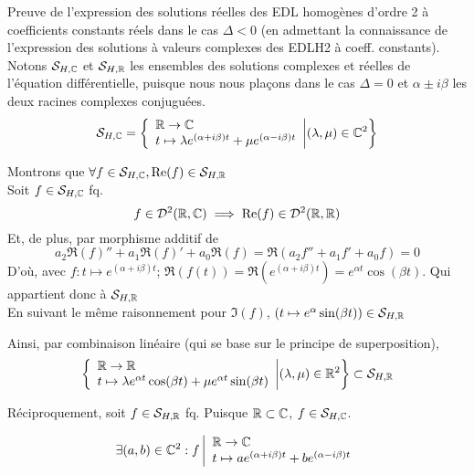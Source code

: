 \documentclass{article}
\begin{document}
\maketitle

\tableofcontents

\pagebreak

\flushleft

\begin{question_kholle}{Preuve de l’expression des solutions réelles des EDL homogènes d’ordre 2 à coefficients constants réels dans le cas $\Delta < 0$ (en admettant la connaissance de l’expression des solutions à valeurs complexes des EDLH2 à coeff. constants).}
	Notons $\mathcal S_{H, \mathbb C}$ et $\mathcal S_{H, \mathbb R}$ les ensembles des solutions complexes et réelles de l'équation différentielle, puisque nous nous plaçons dans le cas $\Delta = 0$ et $\alpha \pm i \beta$ les deux racines complexes conjuguées.
	$$
	\mathcal S_{H, \mathbb C} = 
	\left\{ 
	\begin{array}{l}
    \mathbb R \to \mathbb C  \\
    t \mapsto \lambda e^{(\alpha + i \beta) t}  + \mu e^{(\alpha - i \beta)t}
  \end{array}
	\middle\vert  (\lambda, \mu) \in \mathbb C ^2 \right\}	
	$$
	
	Montrons que $\forall f \in \mathcal S_{H ,\mathbb C}, \text{Re}(f) \in  \mathcal S_{H ,\mathbb R}$\\
	Soit $f \in \mathcal S_{H ,\mathbb C}$ fq.
	$$f \in \mathcal D^2(\mathbb R, \mathbb C) \implies \text{Re}(f) \in \mathcal D^2(\mathbb R, \mathbb R)$$
	Et, de plus, par morphisme additif de \Re
	$$
	a_2\Re(f)'' + a_1\Re(f)' + a_0\Re(f) = \Re( a_2 f'' + a_1 f' + a_0 f) = 0
	$$
	D'où, avec $f:t \mapsto e^{(\alpha + i \beta)t}$; $\Re(f(t)) = \Re(e^{(\alpha + i \beta)t}) = e^{\alpha t } \cos (\beta t)$. Qui appartient donc à $\mathcal S_{H, \mathbb R}$\\
	En suivant le même raisonnement pour $\Im(f)$, $(t \mapsto e^\alpha \sin(\beta t)) \in \mathcal S_{H, \mathbb R}$
	
	
	Ainsi, par combinaison linéaire (qui se base sur le principe de superposition),
	$$
	\left\{ 
	\begin{array}{l}
    \mathbb R \to \mathbb R  \\
    t \mapsto \lambda e^{\alpha t } \cos (\beta t)   + \mu e^{\alpha t } \sin (\beta t)
  \end{array}
	\middle\vert  (\lambda, \mu) \in \mathbb R ^2 \right\}
	\subset \mathcal S_{H ,\mathbb R}
	$$
	
	Réciproquement, soit $ f \in \mathcal S_{H ,\mathbb R}$ fq. Puisque $\mathbb R \subset \mathbb C$,  $ f \in \mathcal S_{H ,\mathbb C}$.
	
	$$
	\exists (a, b) \in \mathbb C^2 : f \left| \begin{array}{l}
    \mathbb R \to \mathbb C  \\
    t \mapsto a e^{(\alpha + i \beta) t}  + b e^{(\alpha - i \beta)t}
	\end{array}\right.$$


\end{question_kholle}
\end{document}
